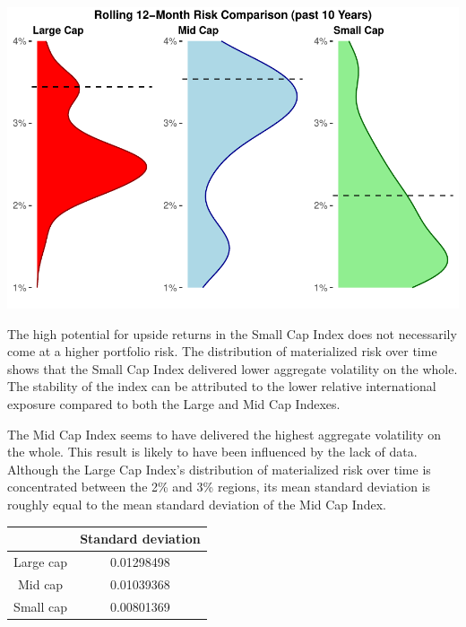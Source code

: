 \documentclass[11pt,preprint, authoryear]{elsarticle}
\let\origfigure\figure
\let\endorigfigure\endfigure
\renewenvironment{figure}[1][2] {
    \expandafter\origfigure\expandafter[H]
} {
    \endorigfigure
}
\let\origtable\table
\let\endorigtable\endtable
\renewenvironment{table}[1][2] {
    \expandafter\origtable\expandafter[H]
} {
    \endorigtable
}
\numberwithin{equation}{section}
\numberwithin{figure}{section}
\numberwithin{table}{section}
\begin{document}
\begin{figure}[H]

{\centering \includegraphics{Volatility-of-Shares_files/figure-latex/Figure10-1} 

}

\caption{Rolling 12-month Risk Comparison (past 10 Years) \label{Figure10}}\label{fig:Figure10}
\end{figure}

The high potential for upside returns in the Small Cap Index does not
necessarily come at a higher portfolio risk. The distribution of
materialized risk over time shows that the Small Cap Index delivered
lower aggregate volatility on the whole. The stability of the index can
be attributed to the lower relative international exposure compared to
both the Large and Mid Cap Indexes.

The Mid Cap Index seems to have delivered the highest aggregate
volatility on the whole. This result is likely to have been influenced
by the lack of data. Although the Large Cap Index's distribution of
materialized risk over time is concentrated between the 2\% and 3\%
regions, its mean standard deviation is roughly equal to the mean
standard deviation of the Mid Cap Index.

\begin{table}[h]
\begin{center}
    \begin{tabular}{| c | c |}
    \hline
         & Standard deviation \\
        \hline
        Large cap & 0.01298498 \\
        Mid cap & 0.01039368 \\
        Small cap & 0.00801369 \\
        \hline
    \end{tabular}
    \caption{Standard deviation}
    \label{tab:SD}
\end{center}
\end{table}
\end{document}
